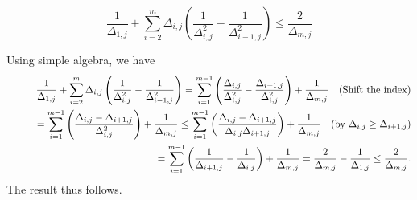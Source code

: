 \documentclass[opre,blindrev]{informs3}
\newcommand{\bE}[1]{{\mathbb{E}\left[#1\right]}}
\newcommand{\bP}[1]{{\mathbb{P}\left(#1\right)}}
\begin{document}
\begin{APPENDICES}


\begin{lemma}\label{lem:technical-1}
    \[\frac{1}{\Delta_{1,j}}+\sum_{i=2}^{m}\Delta_{i,j}\left(\frac{1}{\Delta^2_{i,j}}-\frac{1}{\Delta^2_{i-1,j}}\right)\leq \frac{2}{\Delta_{m,j}}\]
\end{lemma}
    Using simple algebra, we have 
    \begin{eqnarray*}
        &&\frac{1}{\Delta_{1,j}}+\sum_{i=2}^{m}\Delta_{i,j}\left(\frac{1}{\Delta^2_{i,j}}-\frac{1}{\Delta^2_{i-1,j}}\right)
        = \sum_{i=1}^{m-1}\left(\frac{\Delta_{i,j}}{\Delta^2_{i,j}}-\frac{\Delta_{i+1,j}}{\Delta^2_{i,j}}\right)+\frac{1}{\Delta_{m,j}} \quad \hbox {(Shift the index)}\\
        &&\qquad = \sum_{i=1}^{m-1}\left(\frac{\Delta_{i,j}-\Delta_{i+1,j}}{\Delta^2_{i,j}}\right)+\frac{1}{\Delta_{m,j}}
        \leq \sum_{i=1}^{m-1}\left(\frac{\Delta_{i,j}-\Delta_{i+1,j}}{\Delta_{i,j}\Delta_{i+1,j}}\right)+\frac{1}{\Delta_{m,j}} \quad  (\hbox {by } \Delta_{i,j}\geq \Delta_{i+1,j})\\
        && \qquad = \sum_{i=1}^{m-1}\left(\frac{1}{\Delta_{i+1,j}}-\frac{1}{\Delta_{i,j}}\right)+\frac{1}{\Delta_{m,j}}
        = \frac{2}{\Delta_{m,j}}-\frac{1}{\Delta_{1,j}}
        \leq \frac{2}{\Delta_{m,j}}.
    \end{eqnarray*}
The result thus follows. 
\Halmos  


\end{APPENDICES}
\end{document}
